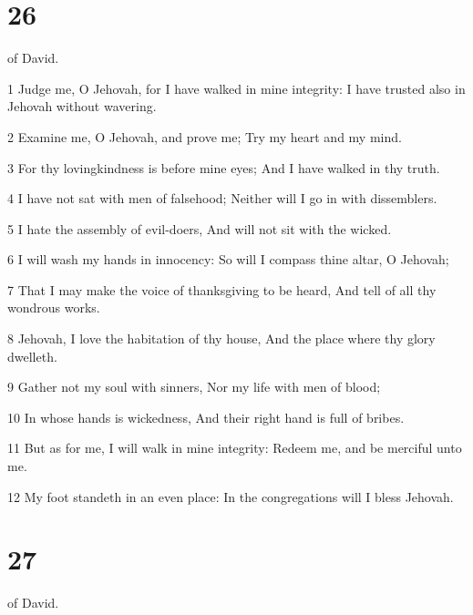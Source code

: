 \chapter{26}

\par [A Psalm] of David.

\par 1 Judge me, O Jehovah, for I have walked in mine integrity: I have trusted also in Jehovah without wavering.
\par 2 Examine me, O Jehovah, and prove me; Try my heart and my mind.
\par 3 For thy lovingkindness is before mine eyes; And I have walked in thy truth.
\par 4 I have not sat with men of falsehood; Neither will I go in with dissemblers.
\par 5 I hate the assembly of evil-doers, And will not sit with the wicked.
\par 6 I will wash my hands in innocency: So will I compass thine altar, O Jehovah;
\par 7 That I may make the voice of thanksgiving to be heard, And tell of all thy wondrous works.
\par 8 Jehovah, I love the habitation of thy house, And the place where thy glory dwelleth.
\par 9 Gather not my soul with sinners, Nor my life with men of blood;
\par 10 In whose hands is wickedness, And their right hand is full of bribes.
\par 11 But as for me, I will walk in mine integrity: Redeem me, and be merciful unto me.
\par 12 My foot standeth in an even place: In the congregations will I bless Jehovah.

\chapter{27}

\par [A Psalm] of David.

